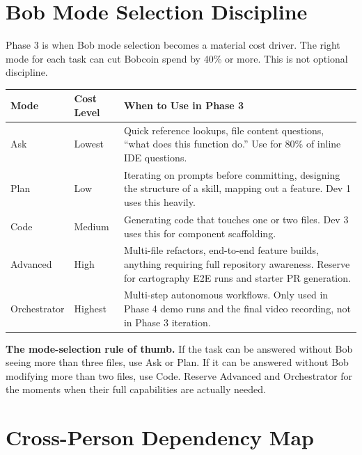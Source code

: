 \documentclass[11pt,letterpaper]{article}
\begin{document}
\section{Bob Mode Selection Discipline}

Phase 3 is when Bob mode selection becomes a material cost driver. The right mode for each task can cut Bobcoin spend by 40\% or more. This is not optional discipline.

\begin{longtable}{|p{2.0cm}|p{4cm}|p{8cm}|}
\hline
\rowcolor{ibmblue!10}
\textbf{Mode} & \textbf{Cost Level} & \textbf{When to Use in Phase 3} \\
\hline
Ask & Lowest & Quick reference lookups, file content questions, ``what does this function do.'' Use for 80\% of inline IDE questions. \\
\hline
Plan & Low & Iterating on prompts before committing, designing the structure of a skill, mapping out a feature. Dev 1 uses this heavily. \\
\hline
Code & Medium & Generating code that touches one or two files. Dev 3 uses this for component scaffolding. \\
\hline
Advanced & High & Multi-file refactors, end-to-end feature builds, anything requiring full repository awareness. Reserve for cartography E2E runs and starter PR generation. \\
\hline
Orchestrator & Highest & Multi-step autonomous workflows. Only used in Phase 4 demo runs and the final video recording, not in Phase 3 iteration. \\
\hline
\end{longtable}

\begin{principle}
\textbf{The mode-selection rule of thumb.} If the task can be answered without Bob seeing more than three files, use Ask or Plan. If it can be answered without Bob modifying more than two files, use Code. Reserve Advanced and Orchestrator for the moments when their full capabilities are actually needed.
\end{principle}

\section{Cross-Person Dependency Map}
\end{document}
